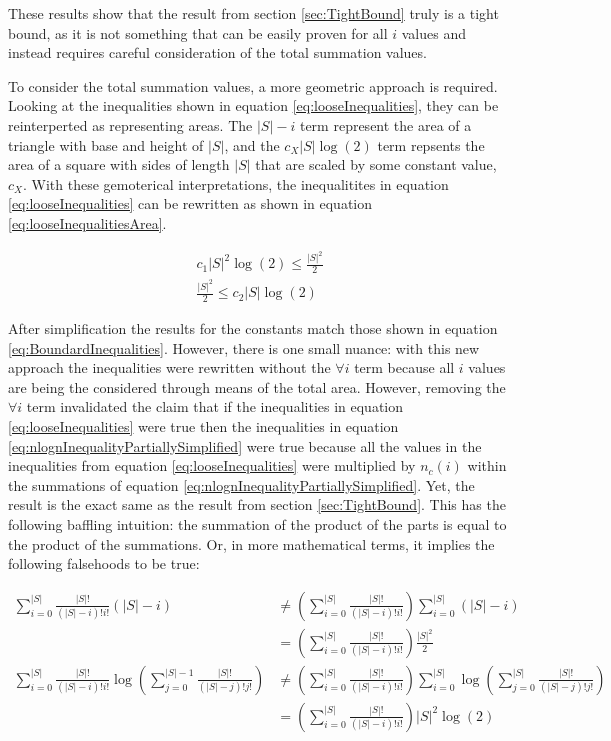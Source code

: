\documentclass{article}
\begin{document}
These results show that the result from section \ref{sec:TightBound} truly is a tight bound, as it is not something that can be easily proven for all $i$ values and instead requires careful consideration of the total summation values.


To consider the total summation values, a more geometric approach is required. Looking at the inequalities shown in equation \ref{eq:looseInequalities}, they can be reinterperted as representing areas. The $|S|-i$ term represent the area of a triangle with base and height of $|S|$, and the $c_X|S|\log(2)$ term repsents the area of a square with sides of length $|S|$ that are scaled by some constant value, $c_X$. With these gemoterical interpretations, the inequalitites in equation \ref{eq:looseInequalities} can be rewritten as shown in equation \ref{eq:looseInequalitiesArea}.

\begin{equation}
	\begin{split}
		c_1|S|^2\log(2)\le \frac{|S|^2}{2} \\
		\frac{|S|^2}{2}\le c_2|S|\log(2)
	\end{split}
	\label{eq:looseInequalitiesArea}
\end{equation}

After simplification the results for the constants match those shown in equation \ref{eq:BoundardInequalities}. However, there is one small nuance: with this new approach the inequalities were rewritten without the $\forall i$ term because all $i$ values are being the considered through means of the total area. However, removing the $\forall i$ term invalidated the claim that if the inequalities in equation \ref{eq:looseInequalities} were true then the inequalities in equation \ref{eq:nlognInequalityPartiallySimplified} were true because all the values in the inequalities from equation \ref{eq:looseInequalities} were multiplied by $n_c(i)$ within the summations of equation \ref{eq:nlognInequalityPartiallySimplified}. Yet, the result is the exact same as the result from section \ref{sec:TightBound}. This has the following baffling intuition: the summation of the product of the parts is equal to the product of the summations. Or, in more mathematical terms, it implies the following falsehoods to be true:

\begin{equation}
	\begin{split}
		\sum_{i=0}^{|S|}\frac{|S|!}{(|S|-i)!i!}\left(|S| -i\right)
		&\ne
		\left( \sum_{i=0}^{|S|}\frac{|S|!}{(|S|-i)!i!} \right)\sum_{i=0}^{|S|}\left(|S| -i\right)
		\\
		&=
		\left( \sum_{i=0}^{|S|}\frac{|S|!}{(|S|-i)!i!} \right)\frac{|S|^2}{2}
		\\
		\sum_{i=0}^{|S|}\frac{|S|!}{(|S|-i)!i!}
        \log \left( \sum_{j=0}^{|S|-1}\frac{|S|!}{(|S|-j)!j!} \right)
        &\ne
        \left( \sum_{i=0}^{|S|}\frac{|S|!}{(|S|-i)!i!} \right)
        \sum_{i=0}^{|S|}
        \log \left( \sum_{j=0}^{|S|}\frac{|S|!}{(|S|-j)!j!} \right)
        \\
        &=
        \left( \sum_{i=0}^{|S|}\frac{|S|!}{(|S|-i)!i!} \right)
        |S|^2\log(2)
	\end{split}
\end{equation}
\end{document}
